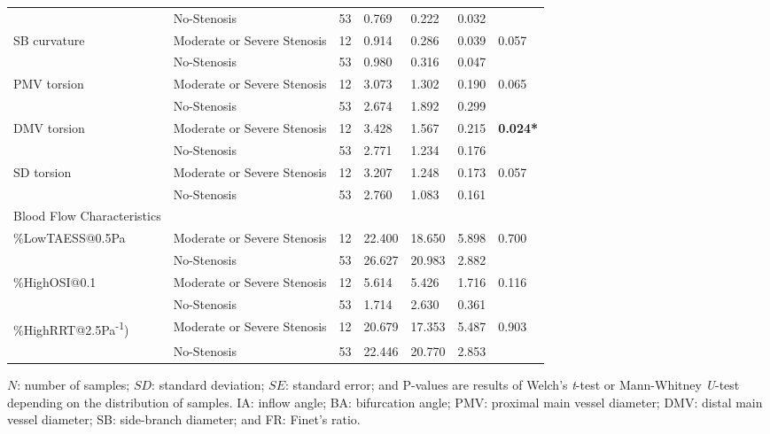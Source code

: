 \documentclass[preprint,11pt,review]{elsarticle}
\begin{document}
\begin{table}
{\begin{threeparttable}
\begin{tabular}{l l l l l l l}
                 & No-Stenosis & 53 & 0.769& 0.222& 0.032&\\
                 SB curvature& Moderate or Severe Stenosis& 12 
& 0.914& 0.286& 0.039&0.057\\
                 & No-Stenosis & 53 & 0.980& 0.316& 0.047&\\
                 PMV torsion& Moderate or Severe Stenosis& 12 
& 3.073& 1.302& 0.190&0.065\\
                 & No-Stenosis & 53 & 2.674& 1.892& 0.299&\\
                 DMV torsion& Moderate or Severe Stenosis& 12 
& 3.428& 1.567& 0.215&\textbf{0.024*}\\
                 & No-Stenosis & 53 & 2.771& 1.234& 0.176&\\
                 SD torsion& Moderate or Severe Stenosis& 12 
& 3.207& 1.248& 0.173&0.057\\
                 & No-Stenosis & 53 & 2.760& 1.083& 0.161&\\
                Blood Flow Characteristics & & & & & &    \\
                \%LowTAESS@0.5Pa& Moderate or Severe Stenosis& 12 & 22.400 & 18.650 & 5.898 & 0.700\\
                 & 
No-Stenosis & 53 & 26.627 & 20.983 & 2.882 &  \\
                \%HighOSI@0.1& Moderate or Severe Stenosis& 12 & 5.614 & 5.426 & 1.716 & 0.116\\
                 & No-Stenosis & 53 & 1.714 & 2.630 & 0.361 &  \\
                \%HighRRT@2.5Pa\textsuperscript{-1})& Moderate or Severe Stenosis& 12 & 20.679 & 17.353 & 5.487 & 0.903\\
                 & No-Stenosis & 53 & 22.446 & 20.770 & 2.853 &  \\
            \bottomrule
        \end{tabular}

        \begin{tablenotes}
            \scriptsize
            \item $N$: number of samples; $SD$: standard deviation; $SE$: standard error; and P-values are results of Welch’s \textit{t}-test or Mann-Whitney \textit{U}-test depending on the distribution of samples. IA: inflow angle; BA: bifurcation angle; PMV: proximal main vessel diameter; DMV: distal main vessel diameter; SB: side-branch diameter; and FR: Finet’s ratio.
        \end{tablenotes}
        \label{tbl:per-bifur}
    \end{threeparttable}
}
\end{table}
\end{document}
